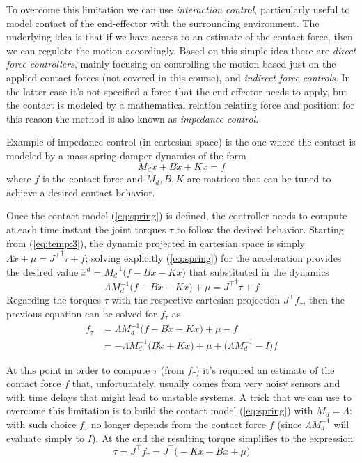 	To overcome this limitation we can use \textit{interaction control}, particularly useful to model contact of the end-effector with the surrounding environment. The underlying idea is that if we have access to an estimate of the contact force, then we can regulate the motion accordingly. Based on this simple idea there are \textit{direct force controllers}, mainly focusing on controlling the motion based just on the applied contact forces (not covered in this course), and \textit{indirect force controls}. In the latter case it's not specified a force that the end-effector needs to apply, but the contact is modeled by a mathematical relation relating force and position: for this reason the method is also known as \textit{impedance control}.
	
	Example of impedance control (in cartesian space) is the one where the contact is modeled by a mass-spring-damper dynamics of the form
	\begin{equation} \label{eq:spring}
		M_d \ddot x + B \dot x + K x = f
	\end{equation}
	where $f$ is the contact force and $M_d,B,K$ are matrices that can be tuned to achieve a desired contact behavior.
	
	Once the contact model (\ref{eq:spring}) is defined, the controller needs to compute at each time instant the joint torques $\tau$ to follow the desired behavior. Starting from (\ref{eq:temp:3}), the dynamic projected in cartesian space is simply $\Lambda \ddot x + \mu = {J^\top}^\dagger \tau + f$; solving explicitly (\ref{eq:spring}) for the acceleration provides the desired value $\ddot x^d = M_d^{-1}\big(f-B\dot x - Kx\big)$ that substituted in the dynamics
	\[ \Lambda M_d^{-1}\big(f - B\dot x - K x\big) + \mu = {J^\top}^\dagger \tau + f \]
	Regarding the torques $\tau$ with the respective cartesian projection $J^\top f_\tau$, then the previous equation can be solved for $f_\tau$ as
	\begin{align*}
		f_\tau & = \Lambda M_d ^{-1} \big( f - B\dot x - Kx \big) + \mu - f \\
		& = -\Lambda M_d^{-1}\big(B\dot x + K x\big) + \mu + \big(\Lambda M_d^{-1} - I\big) f
	\end{align*}
	
	At this point in order to compute $\tau$ (from $f_\tau$) it's required an estimate of the contact force $f$ that, unfortunately, usually comes from very noisy sensors and with time delays that might lead to unstable systems. A trick that we can use to overcome this limitation is to build the contact model (\ref{eq:spring}) with $M_d = \Lambda$: with such choice $f_\tau$ no longer depends from the contact force $f$ (since $\Lambda M_d^{-1}$ will evaluate simply to $I$). At the end the resulting torque simplifies to the expression
	\begin{equation}
		\tau = J^\top f_\tau = J^\top \big(-Kx - B\dot x + \mu\big)
	\end{equation}
	
